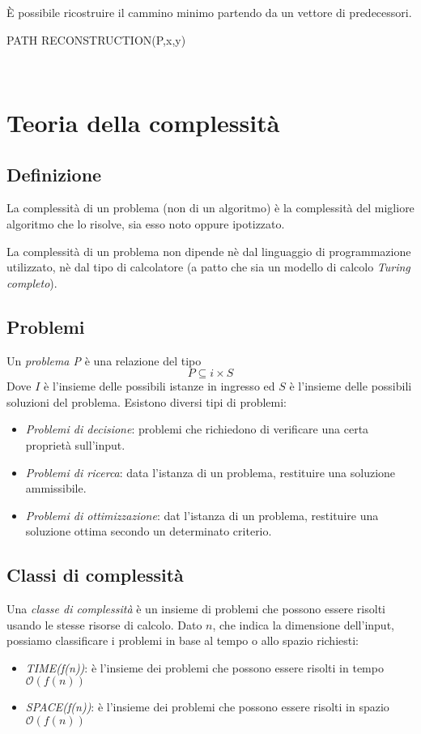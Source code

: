 \documentclass[11pt]{book}
\begin{document}
È possibile ricostruire il cammino minimo partendo da un vettore di predecessori.
\begin{algorithm}
    \caption{PATH RECONSTRUCTION(P,x,y)}
    \begin{algorithmic}
        \\
        \EndIf
    \end{algorithmic}
\end{algorithm}
\chapter{Teoria della complessità}
\section{Definizione}
La complessità di un problema (non di un algoritmo) è la complessità del migliore algoritmo che lo risolve, sia esso noto 
oppure ipotizzato. 

La complessità di un problema non dipende nè dal linguaggio di programmazione utilizzato, nè dal tipo di calcolatore (a 
patto che sia un modello di calcolo \textit{Turing completo}).
\section{Problemi}
Un \textit{problema P} è una relazione del tipo 
\begin{equation*}
    P\subseteq i\times S
\end{equation*}
Dove $I$ è l'insieme delle possibili istanze in ingresso ed $S$ è l'insieme delle possibili soluzioni del problema.
Esistono diversi tipi di problemi:
\begin{itemize}
    \item \textit{Problemi di decisione}: problemi che richiedono di verificare una certa proprietà sull'input.
    \item \textit{Problemi di ricerca}: data l'istanza di un problema, restituire una soluzione ammissibile.
    \item \textit{Problemi di ottimizzazione}: dat l'istanza di un problema, restituire una soluzione ottima secondo un 
    determinato criterio.
\end{itemize}
\section{Classi di complessità}
Una \textit{classe di complessità} è un insieme di problemi che possono essere risolti usando le stesse risorse di calcolo.
Dato $n$, che indica la dimensione dell'input, possiamo classificare i problemi in base al tempo o allo spazio richiesti:
\begin{itemize}
    \item \textit{TIME(f(n))}: è l'insieme dei problemi che possono essere risolti in tempo $\mathcal{O}(f(n))$
    \item \textit{SPACE(f(n))}: è l'insieme dei problemi che possono essere risolti in spazio $\mathcal{O}(f(n))$
\end{itemize}
\end{document}
